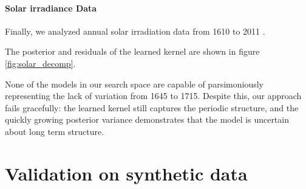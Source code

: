 \documentclass[twoside]{article}
\begin{document}
\paragraph{Solar irradiance Data} 
Finally, we analyzed annual solar irradiation data from 1610 to 2011 \citep{lean1995reconstruction}.
%

%
The posterior and residuals of the learned kernel are shown in figure \ref{fig:solar_decomp}.

%
None of the models in our search space are capable of parsimoniously representing the lack of variation from 1645 to 1715. %
%
%
Despite this, our approach fails gracefully: the learned kernel still captures the periodic structure, and the quickly growing posterior variance demonstrates that the model is uncertain about long term structure.











\section{Validation on synthetic data}
\label{sec:synthetic}


\end{document}
